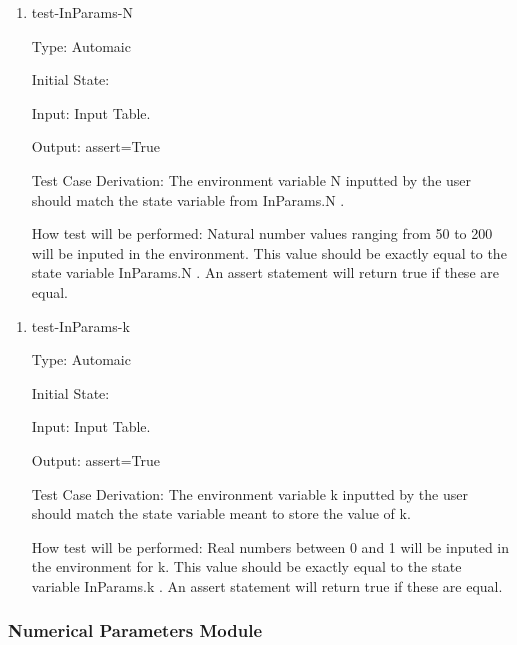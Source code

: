 \documentclass[12pt, titlepage]{article}
\begin{document}

\begin{enumerate}

\item{test-InParams-N\\} \label{INPARAMS}

Type: Automaic
					
Initial State: 
					
Input: Input Table.
					
Output: assert=True

Test Case Derivation: The environment variable N inputted by the user should 
match the state variable from InParams.N .

How test will be performed: Natural number values ranging from 50 to 200 will 
be 
inputed in the environment. This value should be exactly equal to the state 
variable InParams.N . An assert statement will return true if these are equal.
\end{enumerate} 
\begin{enumerate}				
\item{test-InParams-k\\}

Type: Automaic

Initial State: 

Input: Input Table.

Output: assert=True

Test Case Derivation: The environment variable k inputted by the user should 
match the state variable meant to store the value of k.

How test will be performed: Real numbers between 0 and 1 
will be inputed in the environment for k. This value should be exactly equal to 
the state variable InParams.k . An assert statement will return true if these 
are equal.
    
\end{enumerate}

\subsubsection{Numerical Parameters Module}
\end{document}
